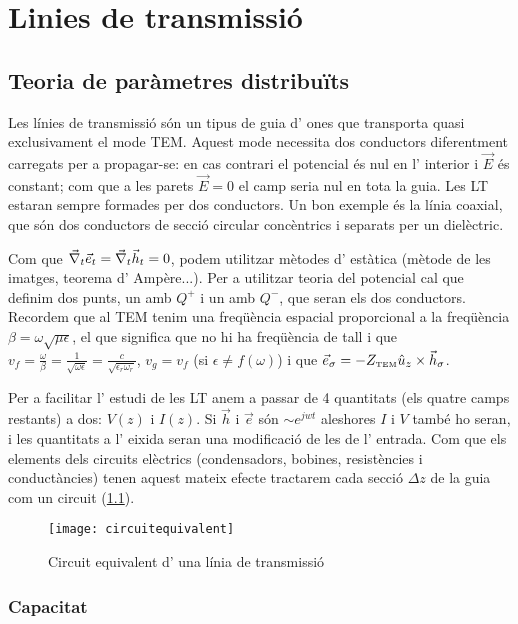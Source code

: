 \chapter{Linies de transmissió}

\section{Teoria de paràmetres distribuïts}

Les línies de transmissió són un tipus de guia d' ones que transporta quasi exclusivament el mode TEM. Aquest mode necessita dos conductors diferentment carregats per a propagar-se: en cas contrari el potencial és nul en l' interior i $\vec E$ és constant; com que a les parets $\vec E = 0$ el camp seria nul en tota la guia. Les LT estaran sempre formades per dos conductors. Un bon exemple és la línia coaxial, que són dos conductors de secció circular concèntrics i separats per un dielèctric.

 Com que $\vec \nabla _t \vec e_t = \vec \nabla _t \vec h_t = 0 $, podem utilitzar mètodes d' estàtica (mètode de les imatges, teorema d' Ampère...). Per a utilitzar teoria del potencial cal que definim dos punts, un amb $Q^+$ i un amb $Q^-$, que seran els dos conductors. Recordem que al TEM tenim una freqüència espacial proporcional a la freqüència $\beta = \omega \sqrt{\mu \epsilon } $, el que significa que no hi ha freqüència de tall i que $v_f = \frac{\omega}{\beta} = \frac{1}{\sqrt{\omega\epsilon}} = \frac{c}{\sqrt{\epsilon _ r \omega _r}}$, $v_g = v_f$ (si $\epsilon \neq f(\omega)$) i que $\vec e_ \sigma = -Z _{\text{\tiny TEM}} \hat u_z \times \vec h _ \sigma$.

Per a facilitar l' estudi de les LT anem a passar de 4 quantitats (els quatre camps restants) a dos:  $V(z)$ i $I(z)$. Si $ \vec h$ i $\vec e$ són $\sim e ^{jwt}$ aleshores $I$ i $V$ també ho seran, i les quantitats a l' eixida seran una modificació  de les de l' entrada. Com que els elements dels circuits elèctrics (condensadors, bobines, resistències i conductàncies) tenen aquest mateix efecte tractarem cada secció $\Delta z$ de la guia com un circuit (\cref{fig:circuit}).

\begin{figure}[h]
  \centering
  \texttt{[image: circuitequivalent]}
  \caption{Circuit equivalent d' una línia de transmissió}
  \label{fig:circuit}
  \vspace{-1 em}
\end{figure}

\subsection{Capacitat}

